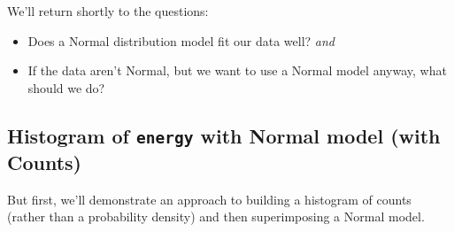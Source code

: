 \documentclass[
]{book}
\providecommand{\tightlist}{%
  \setlength{\itemsep}{0pt}\setlength{\parskip}{0pt}}
\begin{document}
We'll return shortly to the questions:

\begin{itemize}
\tightlist
\item
  Does a Normal distribution model fit our data well? \emph{and}
\item
  If the data aren't Normal, but we want to use a Normal model anyway, what should we do?
\end{itemize}

\hypertarget{histogram-of-energy-with-normal-model-with-counts}{%
\subsection{\texorpdfstring{Histogram of \texttt{energy} with Normal model (with Counts)}{Histogram of energy with Normal model (with Counts)}}\label{histogram-of-energy-with-normal-model-with-counts}}

But first, we'll demonstrate an approach to building a histogram of counts (rather than a probability density) and then superimposing a Normal model.
\end{document}
